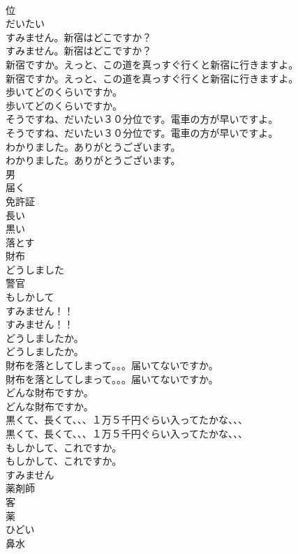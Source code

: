 \documentclass[8pt]{extreport}
\begin{document}
\begin{CJK}{UTF8}{min}
\\	位
\\	だいたい
\\	すみません。新宿はどこですか？	
\\	すみません。新宿はどこですか？ 
\\	新宿ですか。えっと、この道を真っすぐ行くと新宿に行きますよ。	
\\	新宿ですか。えっと、この道を真っすぐ行くと新宿に行きますよ。 
\\	歩いてどのくらいですか。	
\\	歩いてどのくらいですか。 
\\	そうですね、だいたい３０分位です。電車の方が早いですよ。	
\\	そうですね、だいたい３０分位です。電車の方が早いですよ。 
\\	わかりました。ありがとうございます。	
\\	わかりました。ありがとうございます。 
\\	男
\\	届く
\\	免許証
\\	長い
\\	黒い
\\	落とす
\\	財布
\\	どうしました
\\	警官
\\	もしかして
\\	すみません！！	
\\	すみません！！ 
\\	どうしましたか。	
\\	どうしましたか。 
\\	財布を落としてしまって。。。届いてないですか。	
\\	財布を落としてしまって。。。届いてないですか。 
\\	どんな財布ですか。	
\\	どんな財布ですか。 
\\	黒くて、長くて、、、１万５千円ぐらい入ってたかな、、、	
\\	黒くて、長くて、、、１万５千円ぐらい入ってたかな、、、 
\\	もしかして、これですか。	
\\	もしかして、これですか。 
\\	すみません
\\	薬剤師
\\	客
\\	薬
\\	ひどい
\\	鼻水

\end{CJK}
\end{document}
